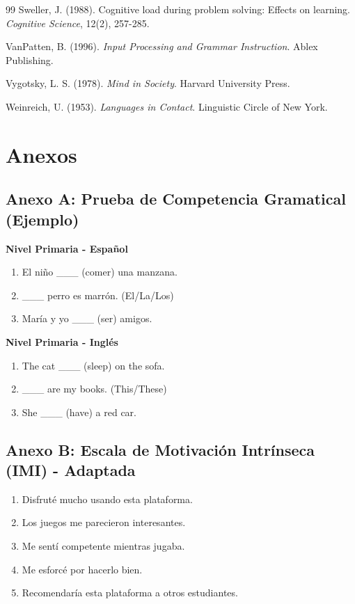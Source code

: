 \documentclass[12pt,a4paper]{article}
\begin{document}
\begin{thebibliography}{99}
Sweller, J. (1988). Cognitive load during problem solving: Effects on learning. \textit{Cognitive Science}, 12(2), 257-285.

VanPatten, B. (1996). \textit{Input Processing and Grammar Instruction}. Ablex Publishing.

Vygotsky, L. S. (1978). \textit{Mind in Society}. Harvard University Press.

Weinreich, U. (1953). \textit{Languages in Contact}. Linguistic Circle of New York.

\end{thebibliography}

\section{Anexos}

\subsection{Anexo A: Prueba de Competencia Gramatical (Ejemplo)}

\textbf{Nivel Primaria - Español}
\begin{enumerate}
    \item El niño \_\_\_ (comer) una manzana.
    \item \_\_\_ perro es marrón. (El/La/Los)
    \item María y yo \_\_\_ (ser) amigos.
\end{enumerate}

\textbf{Nivel Primaria - Inglés}
\begin{enumerate}
    \item The cat \_\_\_ (sleep) on the sofa.
    \item \_\_\_ are my books. (This/These)
    \item She \_\_\_ (have) a red car.
\end{enumerate}

\subsection{Anexo B: Escala de Motivación Intrínseca (IMI) - Adaptada}

\begin{enumerate}
    \item Disfruté mucho usando esta plataforma.
    \item Los juegos me parecieron interesantes.
    \item Me sentí competente mientras jugaba.
    \item Me esforcé por hacerlo bien.
    \item Recomendaría esta plataforma a otros estudiantes.
\end{enumerate}
\end{document}
